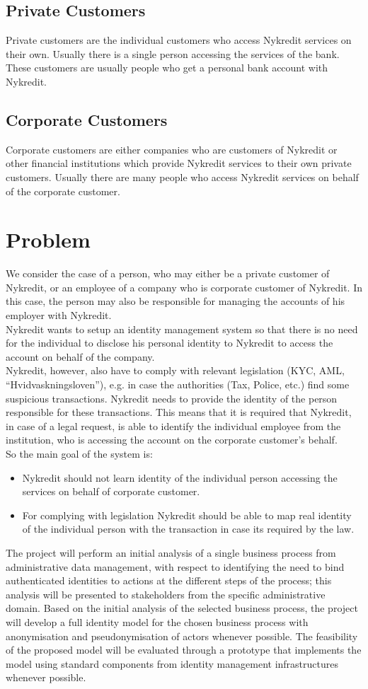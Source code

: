 \subsection{Private Customers}
Private customers are the individual customers who access Nykredit services on their own. Usually there is a single person accessing the services of the bank. These customers are usually people who get a personal bank account with Nykredit.
\subsection{Corporate Customers}
Corporate customers are either companies who are customers of Nykredit or other financial institutions which provide Nykredit services to their own private customers. Usually there are many people who access Nykredit services on behalf of the corporate customer.
\section{Problem}
We consider the case of a person, who may either be a private customer of Nykredit, or an employee of a company who is corporate customer of Nykredit. In this case, the person may also be responsible for managing the accounts of his employer with Nykredit.
\\Nykredit wants to setup an identity management system so that there is no need for the individual to disclose his personal identity to Nykredit to access the account on behalf of the company.
\\Nykredit, however, also have to comply with relevant legislation (KYC, AML, “Hvidvaskningsloven”),  e.g. in case the authorities (Tax, Police, etc.) find some suspicious transactions. Nykredit needs to provide the identity of the person responsible for these transactions.
This means that it is required that Nykredit, in case of a legal request, is able to identify the individual employee from the institution, who is accessing the account on the corporate customer’s behalf.
\\So the main goal of the system is:
\begin{itemize}
	\item Nykredit should not learn identity of the individual person accessing the services on behalf of corporate customer.
	\item For complying with legislation Nykredit should be able to map real identity of the individual person with the transaction in case its required by the law.
\end{itemize}
The project will perform an initial analysis of a single business process from administrative data management, with respect to identifying the need to bind authenticated identities to actions at the different steps of the process; this analysis will be presented to stakeholders from the specific administrative domain. Based on the initial analysis of the selected business process, the project will develop a full identity model for the chosen business process with anonymisation and pseudonymisation of actors whenever possible. The feasibility of the proposed model will be evaluated through a prototype that implements the model using standard components from identity management infrastructures whenever possible.
